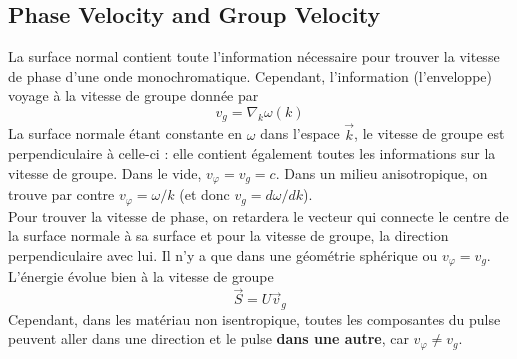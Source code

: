 \subsection{Phase Velocity and Group Velocity}
La surface normal contient toute l'information nécessaire pour trouver la vitesse de phase d'une onde 
monochromatique. Cependant, l'information (l'enveloppe) voyage à la vitesse de groupe donnée par
\begin{equation}
v_g = \nabla_k\omega(k)
\end{equation}
La surface normale étant constante en $\omega$ dans l'espace $\vec k$, le vitesse de groupe est perpendiculaire
à celle-ci : elle contient également toutes les informations sur la vitesse de groupe. Dans le vide, $v_\varphi
=v_g=c$. Dans un milieu anisotropique, on trouve par contre $v_\varphi = \omega/k$ (et donc
$v_g= d\omega/dk$).\\

Pour trouver la vitesse de phase, on retardera le vecteur qui connecte le centre de la surface normale à sa
surface et pour la vitesse de groupe, la direction perpendiculaire avec lui. Il n'y a que dans une géométrie
sphérique ou $v_\varphi=v_g$. L'énergie évolue bien à la vitesse de groupe
\begin{equation}
\vec{S} = U\vec{v}_g
\end{equation}
Cependant, dans les matériau non isentropique, toutes les composantes du pulse peuvent aller dans une direction
et le pulse \textbf{dans une autre}, car $v_\varphi\neq v_g$.